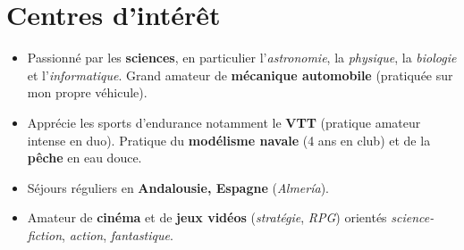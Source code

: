 \documentclass[letterpaper]{twentysecondcv} %
\begin{document}
\section{Centres d'intérêt}
\vspace{-0.15cm}

\begin{itemize}

    \item Passionné par les \textbf{sciences}, en particulier l'\textit{astronomie}, la \textit{physique}, la \textit{biologie} et l'\textit{informatique}. Grand amateur de \textbf{mécanique automobile} (pratiquée sur mon propre véhicule).
    
    \item Apprécie les sports d'endurance notamment le {\textbf{VTT}} (pratique amateur intense en duo). Pratique du {\textbf{modélisme navale}} (4 ans en club) et de la {\textbf{pêche} en eau douce}. 
    
    \item Séjours réguliers en \textbf{Andalousie, Espagne} (\textit{Almería}).
    
    \item Amateur de \textbf{cinéma} et de \textbf{jeux vidéos} (\textit{stratégie}, \textit{RPG}) orientés \textit{science-fiction}, \textit{action}, \textit{fantastique}.
    
\end{itemize}

\end{document}
